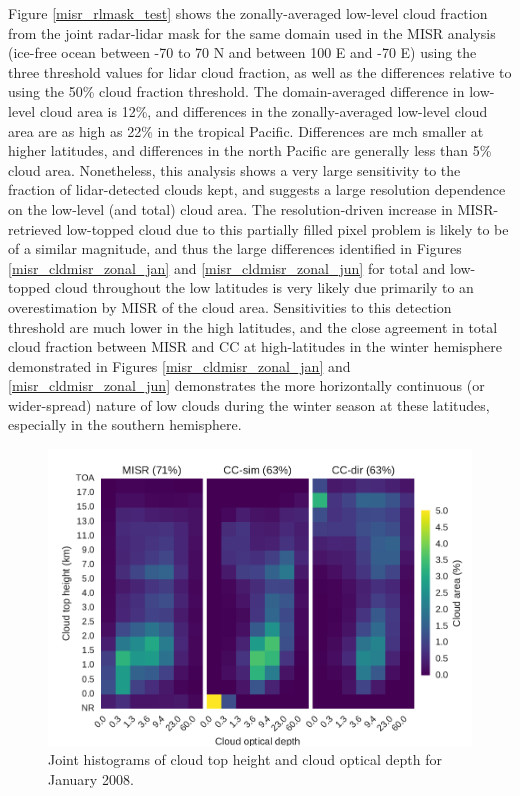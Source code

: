 Figure \ref{misr_rlmask_test} shows the zonally-averaged low-level cloud fraction from the joint radar-lidar mask for the same domain used in the MISR analysis (ice-free ocean between -70 to 70 N and between 100 E and -70 E) using the three threshold values for lidar cloud fraction, as well as the differences relative to using the 50\% cloud fraction threshold. The domain-averaged difference in low-level cloud area is 12\%, and differences in the zonally-averaged low-level cloud area are as high as 22\% in the tropical Pacific. Differences are mch smaller at higher latitudes, and differences in the north Pacific are generally less than 5\% cloud area. Nonetheless, this analysis shows a very large sensitivity to the fraction of lidar-detected clouds kept, and suggests a large resolution dependence on the low-level (and total) cloud area. The resolution-driven increase in MISR-retrieved low-topped cloud due to this partially filled pixel problem is likely to be of a similar magnitude, and thus the large differences identified in Figures \ref{misr_cldmisr_zonal_jan} and \ref{misr_cldmisr_zonal_jun} for total and low-topped cloud throughout the low latitudes is very likely due primarily to an overestimation by MISR of the cloud area. Sensitivities to this detection threshold are much lower in the high latitudes, and the close agreement in total cloud fraction between MISR and CC at high-latitudes in the winter hemisphere demonstrated in Figures \ref{misr_cldmisr_zonal_jan} and \ref{misr_cldmisr_zonal_jun} demonstrates the more horizontally continuous (or wider-spread) nature of low clouds during the winter season at these latitudes, especially in the southern hemisphere.

\begin{figure}
\centering
\includegraphics[width=\columnwidth]{graphics/misr_clmisr_Pacific_2008-01.pdf}
\caption{Joint histograms of cloud top height and cloud optical depth for January 2008.}
\label{misr_cthtau_Pacific_january}
\end{figure}


